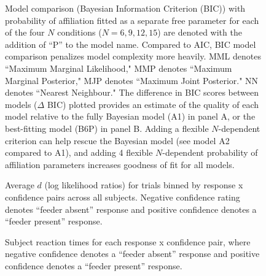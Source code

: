 \documentclass{article}
\begin{document}
\begin{figure}[ht]
\begin{center}
   \caption[Model comparison (Bayesian Information Criterion (BIC)) with probability of affiliation fitted as a separate free parameter]{Model comparison (Bayesian Information Criterion (BIC)) with probability of affiliation fitted as a separate free parameter for each of the four $N$ conditions ($N=6, 9, 12, 15$) are denoted with the addition of ``P'' to the model name. Compared to AIC, BIC model comparison penalizes model complexity more heavily. MML denotes ``Maximum Marginal Likelihood," MMP denotes ``Maximum Marginal Posterior," MJP denotes ``Maximum Joint Posterior." NN denotes ``Nearest Neighbour." The difference in BIC scores between models ($\Delta$ BIC) plotted provides an estimate of the quality of each model relative to the fully Bayesian model (A1) in panel A, or the best-fitting model (B6P) in panel B. Adding a flexible $N$-dependent criterion can help rescue the Bayesian model (see model A2 compared to A1), and adding 4 flexible $N$-dependent probability of affiliation parameters increases goodness of fit for all models.}
   \label{fig:NLLpaff_BIC}
\end{center}
\end{figure}

\begin{figure}[ht]
\begin{center}
   \caption[Average $d$ (log likelihood ratios) for trials binned by response x confidence pairs across all subjects]{Average $d$ (log likelihood ratios) for trials binned by response x confidence pairs across all subjects. Negative confidence rating denotes ``feeder absent'' response and positive confidence denotes a ``feeder present'' response.} 
   \label{fig:conf_corr}
\end{center}
\end{figure}

\begin{figure}[ht]
\begin{center}
   \caption[Subject reaction times for each response x confidence pair]{Subject reaction times for each response x confidence pair, where negative confidence denotes a ``feeder absent'' response and positive confidence denotes a ``feeder present'' response.} 
   \label{fig:RT_by_resp}
\end{center}
\end{figure}
\end{document}
